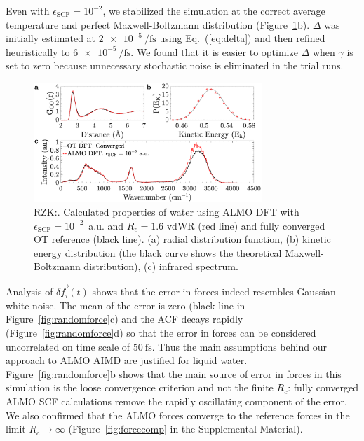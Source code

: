 \documentclass[aps,prl,reprint,amsmath,amssymb]{revtex4-1}
\begin{document}
Even with $\epsilon_{\text{SCF}} = 10^{-2}$, we stabilized the simulation at the correct average temperature and perfect Maxwell-Boltzmann distribution (Figure~\ref{fig:dynproperties}b). $\Delta$ was initially estimated at $\SI{2e-5}{\per\fs}$ using Eq.~(\ref{eq:delta}) and then refined heuristically to $\SI{6e-5}{\per\fs}$. 
We found that it is easier to optimize $\Delta$ when $\gamma$ is set to zero because unnecessary stochastic noise is eliminated in the trial runs. %

\begin{figure}
\includegraphics[trim={1.3cm 0.1cm 3.3cm 1.3cm},clip,width=8.6cm]{Dynamical_Data_Tiled.eps}
\caption{\label{fig:dynproperties} RZK:. Calculated properties of water using ALMO DFT with $\epsilon_{\text{SCF}} = 10^{-2}$~a.u. and $R_{c} = 1.6$ vdWR (red line) and fully converged OT reference (black line).
(a) radial distribution function, 
(b) kinetic energy distribution (the black curve shows the theoretical Maxwell-Boltzmann distribution), 
(c) infrared spectrum.
}
\end{figure}

Analysis of $\delta \vec{f_{i}}(t)$ shows that the error in forces indeed resembles Gaussian white noise. The mean of the error is zero (black line in Figure~\ref{fig:randomforce}c) and the ACF decays rapidly (Figure~\ref{fig:randomforce}d) so that the error in forces can be considered uncorrelated on time scale of $\SI{50}{\fs}$. Thus the main assumptions behind our approach to ALMO AIMD are justified for liquid water. Figure~\ref{fig:randomforce}b shows that the main source of error in forces in this simulation is the loose convergence criterion and not the finite $R_c$: fully converged ALMO SCF calculations remove the rapidly oscillating component of the error. We also confirmed that the ALMO forces converge to the reference forces in the limit $R_{c} \rightarrow \infty$ (Figure~\ref{fig:forcecomp} in the Supplemental Material).
\end{document}
